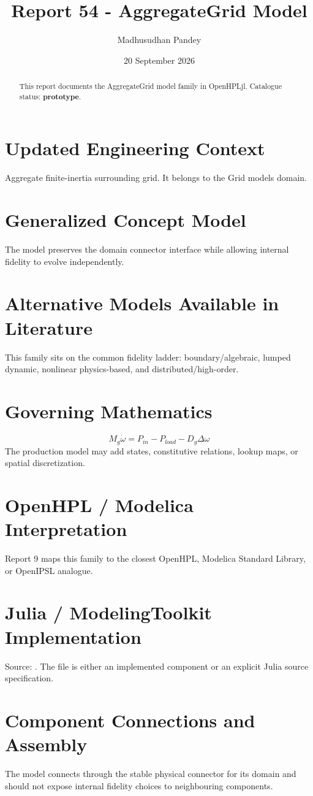\documentclass[10pt,a4paper]{article}
\title{Report 54 - AggregateGrid Model}
\author{Madhusudhan Pandey}
\date{20 September 2026}
\begin{document}
\maketitle
\begin{abstract}This report documents the AggregateGrid model family in OpenHPLjl. Catalogue status: \textbf{prototype}.\end{abstract}
\section{Updated Engineering Context}Aggregate finite-inertia surrounding grid. It belongs to the Grid models domain.
\section{Generalized Concept Model}The model preserves the domain connector interface while allowing internal fidelity to evolve independently.
\section{Alternative Models Available in Literature}This family sits on the common fidelity ladder: boundary/algebraic, lumped dynamic, nonlinear physics-based, and distributed/high-order.
\section{Governing Mathematics}\[M_g\dot\omega=P_{in}-P_{load}-D_g\Delta\omega\]The production model may add states, constitutive relations, lookup maps, or spatial discretization.
\section{OpenHPL / Modelica Interpretation}Report 9 maps this family to the closest OpenHPL, Modelica Standard Library, or OpenIPSL analogue.
\section{Julia / ModelingToolkit Implementation}Source: \texttt{}. The file is either an implemented component or an explicit Julia source specification.
\section{Component Connections and Assembly}The model connects through the stable physical connector for its domain and should not expose internal fidelity choices to neighbouring components.
\end{document}

